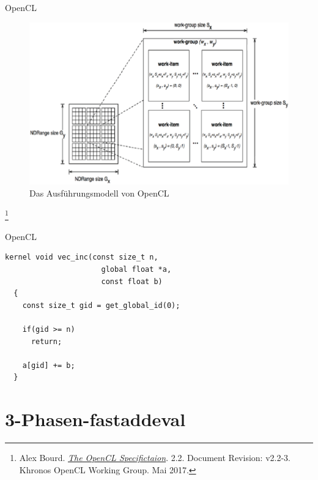 \documentclass[10pt]{beamer}
\let\svthefootnote\thefootnote
\begin{document}
\begin{frame}{OpenCL}
  \begin{figure}
    \centering
    \includegraphics[width=.7\linewidth]{figures/fg-opencl-execution-model.pdf}
    \caption{Das Ausführungsmodell von OpenCL}
  \end{figure}

  \footnotesize
  \let\thefootnote\relax\footnote{Alex Bourd. \href{https://www.khronos.org/registry/OpenCL/specs/opencl-2.2.pdf}{\textit{The OpenCL Specifictaion}}. 2.2. Document Revision: v2.2-3. Khronos OpenCL Working Group. Mai 2017.}
  \addtocounter{footnote}{-1}\let\thefootnote\svthefootnote\relax
  \normalsize
\end{frame}

\begin{frame}[fragile]{OpenCL}
  \begin{lstlisting}[style=CStyle]
  kernel void vec_inc(const size_t n,
                      global float *a,
                      const float b)
  {
    const size_t gid = get_global_id(0);

    if(gid >= n)
      return;

    a[gid] += b;
  }
  \end{lstlisting}
\end{frame}
\section{3-Phasen-fastaddeval}
\end{document}
